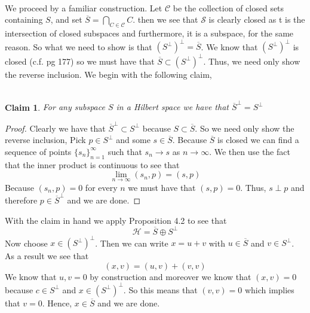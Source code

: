 \documentclass{article}
\newcommand{\problem}[1]{\noindent{\textbf{Problem #1}}\\}
\newtheorem*{claim}{\\ Claim}
\begin{document}
\problem{4.7.10} We proceed by a familiar construction. Let $\mathcal{C}$ be the collection of closed sets containing $S$, and set $\overline{S} = \bigcap_{C \in \mathcal{C}} C$. then we see that $\mathcal{S}$ is clearly closed as t is the intersection of closed subspaces and furthermore, it is a subspace, for the same reason. So what we need to show is that $(S^\perp)^\perp = \overline{S}$. We know that $(S^\perp)^\perp$ is closed (c.f. pg 177) so we must have that $\overline{S} \subset (S^\perp)^\perp$. Thus, we need only show the reverse inclusion. We begin with the following claim,
\begin{claim}
For any subspace $S$ in a Hilbert space we have that $\overline{S}^\perp = S^\perp$
\end{claim}
\begin{proof}
Clearly we have that $\overline{S}^\perp \subset S^\perp$ because $S \subset \overline{S}$. So we need only show the reverse inclusion, Pick $p \in S^\perp$ and some $s \in \overline{S}$. Because $\overline{S}$ is closed we can find a sequence of points $\{s_n\}_{n=1}^\infty$ such that $s_n \to s$ as $n \to \infty$. We then use the fact that the inner product is continuous to see that
\[
\lim_{n\to \infty} (s_n,p) = (s,p)
\]
Because $(s_n,p) = 0$ for every $n$ we must have that $(s,p) = 0$. Thus, $s \perp p$ and therefore $p \in \overline{S}^\perp$ and we are done. 
\end{proof}
With the claim in hand we apply Proposition 4.2 to see that
\[
\mathcal{H} = \overline{S} \oplus S^\perp
\]
Now choose $x \in (S^\perp)^\perp$. Then we can write $x = u + v$ with $u \in \overline{S}$ and $v \in S^\perp$. As a result we see that
\[
(x,v) = (u,v) + (v,v) 
\]
We know that $u,v = 0$ by construction and moreover we know that $(x,v) = 0$ because $c \in S^\perp$ and $x \in (S^\perp)^\perp$. So this means that $(v,v) = 0$ which implies that $v = 0$. Hence, $x \in \overline{S}$ and we are done. 
\end{document}
